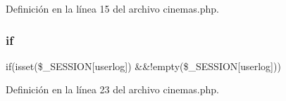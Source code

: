 Definición en la línea 15 del archivo cinemas.\+php.

\mbox{\label{cinemas_8php_aefb5893336d7ead40ae915367f4b82cc}} 
\subsubsection{\texorpdfstring{if}{if}}
{\footnotesize\ttfamily if(isset(\$\+\_\+\+S\+E\+S\+S\+I\+ON\mbox{[}\textquotesingle{}userlog\textquotesingle{}\mbox{]}) \&\&!empty(\$\+\_\+\+S\+E\+S\+S\+I\+ON\mbox{[}\textquotesingle{}userlog\textquotesingle{}\mbox{]}))}



Definición en la línea 23 del archivo cinemas.\+php.

